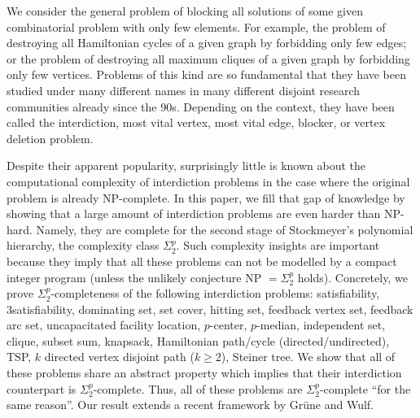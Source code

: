 We consider the general problem of blocking all solutions of some given combinatorial problem with only few elements. 
For example, the problem of destroying all Hamiltonian cycles of a given graph by forbidding only few edges; or the problem of destroying all maximum cliques of a given graph by forbidding only few vertices.
Problems of this kind are so fundamental that they have been studied under many different names in many different disjoint research communities already since the 90s.
Depending on the context, they have been called the interdiction, most vital vertex, most vital edge, blocker, or vertex deletion problem.

Despite their apparent popularity, surprisingly little is known about the computational complexity of interdiction problems in the case where the original problem is already NP-complete.
In this paper, we fill that gap of knowledge by showing that a large amount of interdiction problems are even harder than NP-hard. 
Namely, they are complete for the second stage of Stockmeyer's polynomial hierarchy, the complexity class $\Sigma^p_2$.
Such complexity insights are important because they imply that all these problems can not be modelled by a compact integer program (unless the unlikely conjecture NP $= \Sigma_2^p$ holds).
Concretely, we prove $\Sigma^p_2$-completeness of the following interdiction problems:
    satisfiability,
    3satisfiability,
    dominating set,
    set cover,
    hitting set,
    feedback vertex set,
    feedback arc set,
    uncapacitated facility location,
    $p$-center,
    $p$-median,
    independent set,
    clique,
    subset sum,
    knapsack,
    Hamiltonian path/cycle (directed/undirected),
    TSP,
    $k$ directed vertex disjoint path ($k \geq 2$),
    Steiner tree.
We show that all of these problems share an abstract property which implies that their interdiction counterpart is $\Sigma_2^p$-complete.
Thus, all of these problems are $\Sigma_2^p$-complete \enquote{for the same reason}.
Our result extends a recent framework by Grüne and Wulf.
